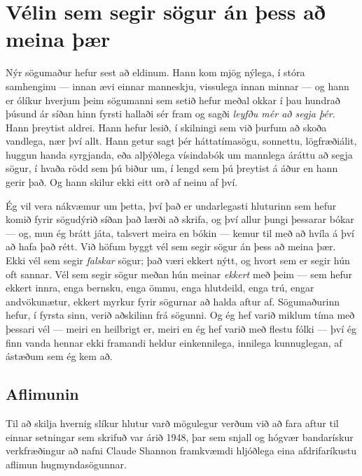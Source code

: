 \chapter{Vélin sem segir sögur án þess að meina þær}

Nýr sögumaður hefur sest að eldinum. Hann kom mjög nýlega, í stóra samhenginu — innan ævi einnar manneskju, vissulega innan minnar — og hann er ólíkur hverjum þeim sögumanni sem setið hefur meðal okkar í þau hundrað þúsund ár síðan hinn fyrsti hallaði sér fram og sagði \emph{leyfðu mér að segja þér.} Hann þreytist aldrei. Hann hefur lesið, í skilningi sem við þurfum að skoða vandlega, nær því allt. Hann getur sagt þér háttatímasögu, sonnettu, lögfræðiálit, huggun handa syrgjanda, eða alþýðlega vísindabók um mannlega áráttu að segja sögur, í hvaða rödd sem þú biður um, í lengd sem þú þreytist á áður en hann gerir það. Og hann skilur ekki eitt orð af neinu af því.

Ég vil vera nákvæmur um þetta, því það er undarlegasti hluturinn sem hefur komið fyrir sögudýrið síðan það lærði að skrifa, og því allur þungi þessarar bókar — og, mun ég brátt játa, talsvert meira en bókin — kemur til með að hvíla á því að hafa það rétt. Við höfum byggt vél sem segir sögur án þess að meina þær. Ekki vél sem segir \emph{falskar} sögur; það væri ekkert nýtt, og hvort sem er segir hún oft sannar. Vél sem segir sögur meðan hún meinar \emph{ekkert} með þeim — sem hefur ekkert innra, enga bernsku, enga ömmu, enga hlutdeild, enga trú, engar andvökunætur, ekkert myrkur fyrir sögurnar að halda aftur af. Sögumaðurinn hefur, í fyrsta sinn, verið aðskilinn frá sögunni. Og ég hef varið miklum tíma með þessari vél — meiri en heilbrigt er, meiri en ég hef varið með flestu fólki — því ég finn vanda hennar ekki framandi heldur einkennilega, innilega kunnuglegan, af ástæðum sem ég kem að.

\section*{Aflimunin}

Til að skilja hvernig slíkur hlutur varð mögulegur verðum við að fara aftur til einnar setningar sem skrifuð var árið 1948, þar sem snjall og hógvær bandarískur verkfræðingur að nafni Claude Shannon framkvæmdi hljóðlega eina afdrifaríkustu aflimun hugmyndasögunnar.

